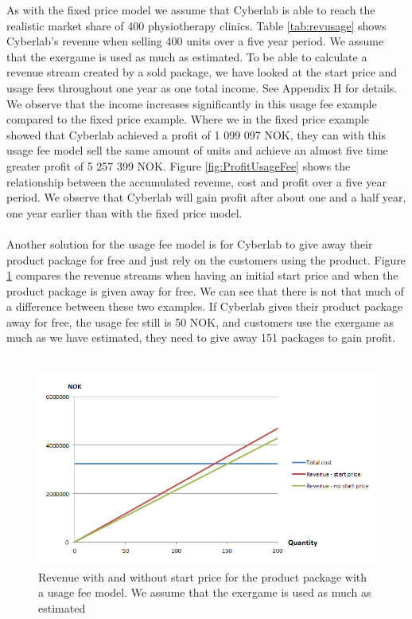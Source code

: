 As with the fixed price model we assume that Cyberlab is able to reach the realistic market share of 400 physiotherapy clinics. Table \ref{tab:revusage} shows Cyberlab's revenue when selling 400 units over a five year period. We assume that the exergame is used as much as estimated. To be able to calculate a revenue stream created by a sold package, we have looked at the start price and usage fees throughout one year as one total income. See Appendix H for details. We observe that the income increases significantly in this usage fee example compared to the fixed price example. Where we in the fixed price example showed that Cyberlab achieved a profit of 1 099 097 NOK, they can with this usage fee model sell the same amount of units and achieve an almost five time greater profit of 5 257 399 NOK. Figure \ref{fig:ProfitUsageFee} shows the relationship between the accumulated revenue, cost and profit over a five year period. We observe that Cyberlab will gain profit after about one and a half year, one year earlier than with the fixed price model. \\ \\
Another solution for the usage fee model is for Cyberlab to give away their product package for free and just rely on the customers using the product. Figure \ref{fig:UsageWithWithout} compares the revenue streams when having an initial start price and when the product package is given away for free. We can see that there is not that much of a difference between these two examples. If Cyberlab gives their product package away for free, the usage fee still is 50 NOK, and customers use the exergame as much as we have estimated, they need to give away 151 packages to gain profit. \\ \\
\begin{figure}
\begin{center}
\includegraphics[scale=0.8]{usagewithwithoutstartprice}
\caption[Usage fee example]{Revenue with and without start price for the product package with a usage fee model. We assume that the exergame is used as much as estimated}
\label{fig:UsageWithWithout}
\end{center}
\end{figure}
